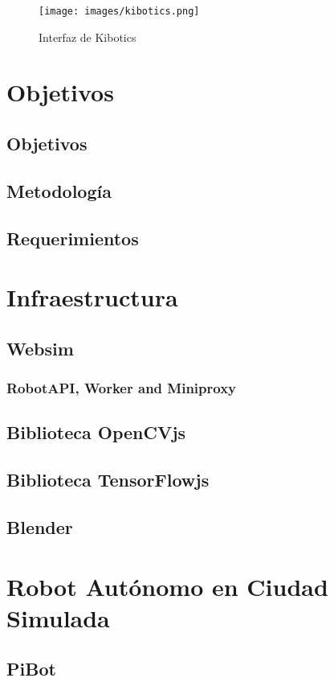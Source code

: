 \documentclass{report}
\begin{document}
\begin{figure}[h]
	\centering
	 \texttt{[image: images/kibotics.png]}
	 \caption{Interfaz de Kibotics}
\end{figure}



\chapter{Objetivos}

\section{Objetivos}
\section{Metodología}
\section{Requerimientos}

\chapter{Infraestructura}
\section{Websim}
\subsection{RobotAPI, Worker and Miniproxy}
\section{Biblioteca OpenCVjs}
\section{Biblioteca TensorFlowjs}
\section{Blender}

\chapter{Robot Autónomo en Ciudad Simulada}
\section{PiBot}
\end{document}
